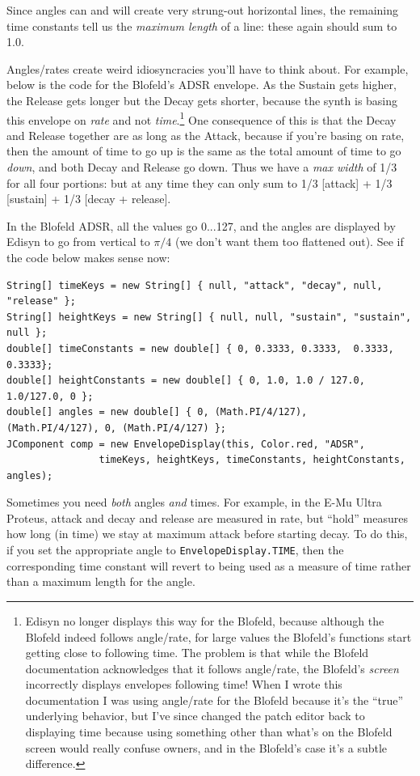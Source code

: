\documentclass{article}
\begin{document}
\begin{itemize}
Since angles can and will create very strung-out horizontal lines, the remaining time constants tell us the {\it maximum length} of a line: these again should sum to 1.0.

Angles/rates create weird idiosyncracies you'll have to think about.  For example, below is the code for the Blofeld's ADSR envelope.  As the Sustain gets higher, the Release gets longer but the Decay gets shorter, because the synth is basing this envelope on {\it rate} and not {\it time}.\footnote{Edisyn no longer displays this way for the Blofeld, because although the Blofeld indeed follows angle/rate, for large values the Blofeld's functions start getting close to following time.  The problem is that while the Blofeld documentation acknowledges that it follows angle/rate, the Blofeld's {\it screen} incorrectly displays envelopes following time!  When I wrote this documentation I was using angle/rate for the Blofeld because it's the ``true'' underlying behavior, but I've since changed the patch editor back to displaying time because using something other than what's on the Blofeld screen would really confuse owners, and in the Blofeld's case it's a subtle difference.}  One consequence of this is that the Decay and Release together are as long as the Attack, because if you're basing on rate, then the amount of time to go up is the same as the total amount of time to go {\it down}, and both Decay and Release go down.  Thus we have a {\it max width} of 1/3 for all four portions: but at any time they can only sum to 1/3 [attack] + 1/3 [sustain] + 1/3 [decay + release].

In the Blofeld ADSR, all the values go 0...127, and the angles are displayed by Edisyn to go from vertical to \(\pi/4\) (we don't want them too flattened out).  See if the code below makes sense now:

\begin{verbatim}
String[] timeKeys = new String[] { null, "attack", "decay", null, "release" };
String[] heightKeys = new String[] { null, null, "sustain", "sustain", null };
double[] timeConstants = new double[] { 0, 0.3333, 0.3333,  0.3333, 0.3333};
double[] heightConstants = new double[] { 0, 1.0, 1.0 / 127.0, 1.0/127.0, 0 };
double[] angles = new double[] { 0, (Math.PI/4/127),   (Math.PI/4/127), 0, (Math.PI/4/127) };
JComponent comp = new EnvelopeDisplay(this, Color.red, "ADSR", 
                timeKeys, heightKeys, timeConstants, heightConstants, angles);
\end{verbatim}

Sometimes you need {\it both} angles {\it and} times.  For example, in the E-Mu Ultra Proteus, attack and decay and release are measured in rate, but ``hold'' measures how long (in time) we stay at maximum attack before starting decay.  To do this, if you set the appropriate angle to {\tt EnvelopeDisplay.TIME}, then the corresponding time constant will revert to being used as a measure of time rather than a maximum length for the angle.


\end{itemize}
\end{document}
